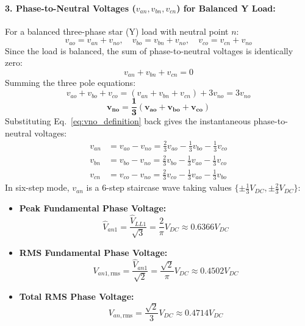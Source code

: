 \paragraph{3. Phase-to-Neutral Voltages ($v_{an}, v_{bn}, v_{cn}$) for Balanced Y Load:}
For a balanced three-phase star (Y) load with neutral point $n$:
\begin{equation}
v_{ao} = v_{an} + v_{no}, \quad v_{bo} = v_{bn} + v_{no}, \quad v_{co} = v_{cn} + v_{no}
\end{equation}
Since the load is balanced, the sum of phase-to-neutral voltages is identically zero:
\begin{equation}
v_{an} + v_{bn} + v_{cn} = 0
\end{equation}
Summing the three pole equations:
\begin{equation}
v_{ao} + v_{bo} + v_{co} = (v_{an} + v_{bn} + v_{cn}) + 3 v_{no} = 3 v_{no}
\end{equation}
\begin{equation}
\label{eq:vno_definition}
\mathbf{v_{no} = \frac{1}{3}\left(v_{ao} + v_{bo} + v_{co}\right)}
\end{equation}
Substituting Eq.~\ref{eq:vno_definition} back gives the instantaneous phase-to-neutral voltages:
\begin{align}
v_{an} &= v_{ao} - v_{no} = \frac{2}{3} v_{ao} - \frac{1}{3} v_{bo} - \frac{1}{3} v_{co} \\
v_{bn} &= v_{bo} - v_{no} = \frac{2}{3} v_{bo} - \frac{1}{3} v_{ao} - \frac{1}{3} v_{co} \\
v_{cn} &= v_{co} - v_{no} = \frac{2}{3} v_{co} - \frac{1}{3} v_{ao} - \frac{1}{3} v_{bo}
\end{align}
In six-step mode, $v_{an}$ is a 6-step staircase wave taking values $\{\pm \frac{1}{3} V_{DC}, \pm \frac{2}{3} V_{DC}\}$:
\begin{itemize}
  \item \textbf{Peak Fundamental Phase Voltage:}
  \begin{equation}
  \hat{V}_{an1} = \frac{\hat{V}_{LL1}}{\sqrt{3}} = \frac{2}{\pi} V_{DC} \approx 0.6366 V_{DC}
  \end{equation}
  \item \textbf{RMS Fundamental Phase Voltage:}
  \begin{equation}
  V_{an1,\mathrm{rms}} = \frac{\hat{V}_{an1}}{\sqrt{2}} = \frac{\sqrt{2}}{\pi} V_{DC} \approx 0.4502 V_{DC}
  \end{equation}
  \item \textbf{Total RMS Phase Voltage:}
  \begin{equation}
  V_{an,\mathrm{rms}} = \frac{\sqrt{2}}{3} V_{DC} \approx 0.4714 V_{DC}
  \end{equation}
\end{itemize}

